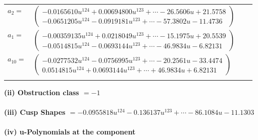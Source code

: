 \documentclass[1p]{elsarticle_modified}
\theoremstyle{definition}
\begin{document}
\begin{tabular}{m{7pt} m{180pt} m{7pt} m{180pt} }
\flushright $a_{2}=$&$\begin{pmatrix}-0.0165610 u^{124}+0.00694800 u^{123}+\cdots-26.5606 u+21.5758\\-0.0651205 u^{124}-0.0919181 u^{123}+\cdots-57.3802 u-11.4736\end{pmatrix}$ \\
\flushright $a_{1}=$&$\begin{pmatrix}-0.00359135 u^{124}+0.0218049 u^{123}+\cdots-15.1975 u+20.5539\\-0.0514815 u^{124}-0.0693144 u^{123}+\cdots-46.9834 u-6.82131\end{pmatrix}$ \\
\flushright $a_{10}=$&$\begin{pmatrix}-0.0277532 u^{124}-0.0756995 u^{123}+\cdots-20.2561 u-33.4474\\0.0514815 u^{124}+0.0693144 u^{123}+\cdots+46.9834 u+6.82131\end{pmatrix}$\\&\end{tabular}
\flushleft \textbf{(ii) Obstruction class $= -1$}\\~\\
\flushleft \textbf{(iii) Cusp Shapes $= -0.0955818 u^{124}-0.136137 u^{123}+\cdots-86.1084 u-11.1303$}\\~\\
\newpage\renewcommand{\arraystretch}{1}
\flushleft \textbf{(iv) u-Polynomials at the component}\newline \\
\end{document}
